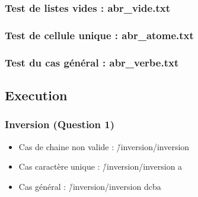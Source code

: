 \documentclass{report}
\begin{document}
\subsubsection{Test de listes vides : abr\_vide.txt}


\subsubsection{Test de cellule unique : abr\_atome.txt}


\subsubsection{Test du cas général : abr\_verbe.txt}


\newpage
\subsection{Execution}
\subsubsection{Inversion (Question 1)}
\begin{itemize}
    \item Cas de chaine non valide : \./inversion/inversion
\vspace{0.5cm}

\vspace{0.5cm}

    \item Cas caractère unique : \./inversion/inversion a
\vspace{0.5cm}

\vspace{0.5cm}

    \item Cas général : \./inversion/inversion dcba
\vspace{0.5cm}

\vspace{0.5cm}
\end{itemize}

\newpage
\end{document}
